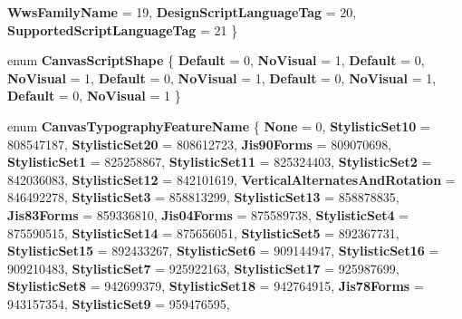 \begin{DoxyCompactItemize}
{\bfseries Wws\+Family\+Name} = 19, 
\newline
{\bfseries Design\+Script\+Language\+Tag} = 20, 
{\bfseries Supported\+Script\+Language\+Tag} = 21
 \}
\item 
\mbox{\label{namespace_microsoft_1_1_graphics_1_1_canvas_1_1_text_a384b9463c1092502564c5ab676b2de09}} 
enum {\bfseries Canvas\+Script\+Shape} \{ \newline
{\bfseries Default} = 0, 
{\bfseries No\+Visual} = 1, 
{\bfseries Default} = 0, 
{\bfseries No\+Visual} = 1, 
\newline
{\bfseries Default} = 0, 
{\bfseries No\+Visual} = 1, 
{\bfseries Default} = 0, 
{\bfseries No\+Visual} = 1, 
\newline
{\bfseries Default} = 0, 
{\bfseries No\+Visual} = 1
 \}
\item 
\mbox{\label{namespace_microsoft_1_1_graphics_1_1_canvas_1_1_text_a0b3acf542d0a5a81f48cf181f63ab6d7}} 
enum {\bfseries Canvas\+Typography\+Feature\+Name} \{ \newline
{\bfseries None} = 0, 
{\bfseries Stylistic\+Set10} = 808547187, 
{\bfseries Stylistic\+Set20} = 808612723, 
{\bfseries Jis90\+Forms} = 809070698, 
\newline
{\bfseries Stylistic\+Set1} = 825258867, 
{\bfseries Stylistic\+Set11} = 825324403, 
{\bfseries Stylistic\+Set2} = 842036083, 
{\bfseries Stylistic\+Set12} = 842101619, 
\newline
{\bfseries Vertical\+Alternates\+And\+Rotation} = 846492278, 
{\bfseries Stylistic\+Set3} = 858813299, 
{\bfseries Stylistic\+Set13} = 858878835, 
{\bfseries Jis83\+Forms} = 859336810, 
\newline
{\bfseries Jis04\+Forms} = 875589738, 
{\bfseries Stylistic\+Set4} = 875590515, 
{\bfseries Stylistic\+Set14} = 875656051, 
{\bfseries Stylistic\+Set5} = 892367731, 
\newline
{\bfseries Stylistic\+Set15} = 892433267, 
{\bfseries Stylistic\+Set6} = 909144947, 
{\bfseries Stylistic\+Set16} = 909210483, 
{\bfseries Stylistic\+Set7} = 925922163, 
\newline
{\bfseries Stylistic\+Set17} = 925987699, 
{\bfseries Stylistic\+Set8} = 942699379, 
{\bfseries Stylistic\+Set18} = 942764915, 
{\bfseries Jis78\+Forms} = 943157354, 
\newline
{\bfseries Stylistic\+Set9} = 959476595, 

\end{DoxyCompactItemize}
